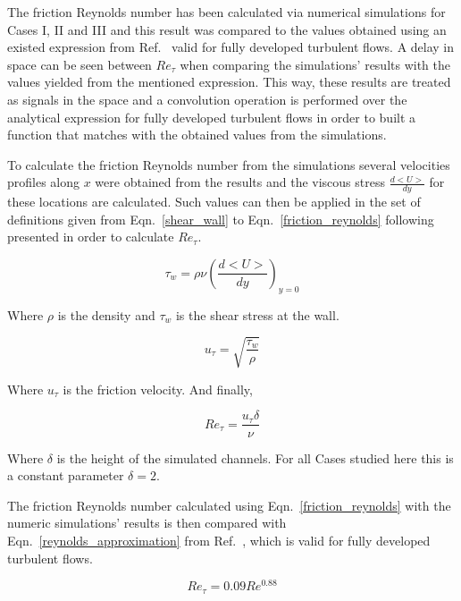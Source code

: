 \documentclass[twocolumn,10pt]{asme2e}
\begin{document}
The friction Reynolds number has been calculated via numerical simulations for Cases I, II and III and this result was compared to the values obtained using an existed expression from Ref.~\cite{pope} valid for fully developed turbulent flows. A delay in space can be seen between \(Re_{\tau}\) when comparing the simulations' results with the values yielded from the mentioned expression. This way, these results are treated as signals in the space and a convolution operation is performed over the analytical expression for fully developed turbulent flows in order to built a function that matches with the obtained values from the simulations.

To calculate the friction Reynolds number from the simulations several velocities profiles along \(x\) were obtained from the results and the viscous stress \(\frac{d<U>}{dy}\) for these locations are calculated. Such values can then be applied in the set of definitions given from Eqn.~\ref{shear_wall} to Eqn.~\ref{friction_reynolds} following presented in order to calculate \(Re_{\tau}\).

\begin{equation}
{\tau}_w = \rho\nu\left(\frac{d<U>}{dy}\right)_{y=0}
\label{shear_wall}
\end{equation}

Where \(\rho\) is the density and \({\tau}_w\)  is the shear stress at the wall.

\begin{equation}
u_{\tau} = \sqrt{\frac{{\tau}_w}{\rho}}
\label{u_t}
\end{equation}

Where \(u_{\tau}\) is the friction velocity. And finally,

\begin{equation}
Re_{\tau} = \frac{u_{\tau}\delta}{\nu}
\label{friction_reynolds}
\end{equation}

Where \(\delta\) is the height of the simulated channels. For all Cases studied here this is a constant parameter \(\delta=2\).

The friction Reynolds number calculated using Eqn.~\ref{friction_reynolds} with the numeric simulations' results is then compared with Eqn.~\ref{reynolds_approximation} from Ref.~\cite{pope}, which is valid for fully developed turbulent flows.

\begin{equation}
Re_{\tau} = 0.09Re^{0.88}
\label{reynolds_approximation}
\end{equation}
\end{document}
